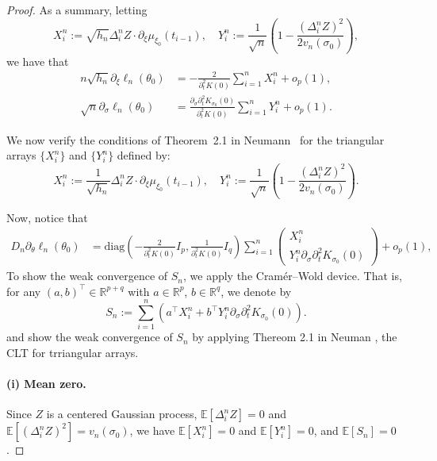 \documentclass[a4paper,10pt,twoside]{article}
\numberwithin{equation}{section}
\def\Y{\mathbb{Y}}
\def\l{\left}
\def\r{\right}
\def\s{\sigma}
\def\E{\mathbb{E}}
\begin{document}
\begin{proof}
As a summary, letting 
\[
X_i^n := \sqrt{h_n} \Delta_i^n Z \cdot \partial_\xi \mu_{\xi_0}(t_{i-1}),
\quad
Y_i^n := \frac{1}{\sqrt{n}} \l( 1 - \frac{(\Delta_i^n Z)^2}{2 v_n(\s_0)} \r), 
\]
we have that 
\begin{align*}
n \sqrt{h_n}  \partial_\xi \ell_n(\theta_0) &= - \frac{2}{\partial_t^2 K(0)} \sum_{i=1}^n X_i^n + o_p(1), \\
\sqrt{n} \partial_\sigma \ell_n(\theta_0) &= \frac{\partial_\sigma \partial_t^2 K_{\s_0}(0)}{\partial_t^2 K(0)} \sum_{i=1}^n Y_i^n + o_p(1).
\end{align*}

We now verify the conditions of Theorem~2.1 in Neumann~\cite{n13} for the triangular arrays $\{X_i^n\}$ and $\{Y_i^n\}$ defined by:
\[
X_i^n := \frac{1}{\sqrt{h_n}}\Delta_i^n Z \cdot \partial_\xi \mu_{\xi_0}(t_{i-1}),
\quad
Y_i^n := \frac{1}{\sqrt{n}} \l( 1 - \frac{(\Delta_i^n Z)^2}{2 v_n(\sigma_0)} \r).
\]

Now, notice that 
\begin{align*}
D_n \partial_\theta \ell_n(\theta_0) 
&=\mathrm{diag}\l(- \frac{2}{\partial_t^2 K(0)}I_p,  \frac{1}{\partial_t^2 K(0)}I_q\r) 
\sum_{i=1}^n \begin{pmatrix} X_i^n \\Y_i^n\partial_\sigma \partial_t^2 K_{\s_0}(0)\end{pmatrix}  + o_p(1), 
\end{align*}
To show the weak convergence of $S_n$, we apply the Cram\'er--Wold device. 
That is, for any $(a,b)^\top \in \mathbb{R}^{p+q}$ with $a \in \mathbb{R}^p$, $b \in \mathbb{R}^q$, we denote by 
\[
S_n := \sum_{i=1}^n \l( a^\top X_i^n + b^\top Y_i^n\partial_\sigma \partial_t^2 K_{\s_0}(0) \r).
\]
and show the weak convergence of $S_n$ by applying Thereom 2.1 in Neuman \cite{n13}, the CLT for trriangular arrays. 

\paragraph{(i) Mean zero.}
Since $Z$ is a centered Gaussian process, $\E[\Delta_i^n Z] = 0$ and $\E[(\Delta_i^n Z)^2] = v_n(\sigma_0)$, we have 
$\E[X_i^n] = 0$ and $\E[Y_i^n] = 0$, and $\E[S_n]=0$. 


\end{proof}
\end{document}
